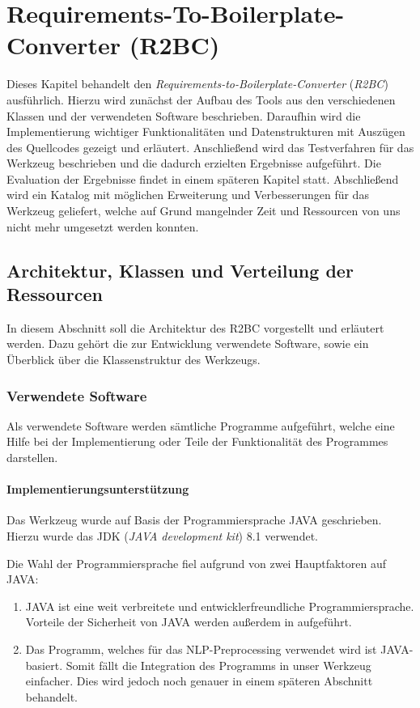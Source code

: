 \documentclass[12pt]{report}
\begin{document}
\chapter{Requirements-To-Boilerplate-Converter (R2BC)}
Dieses Kapitel behandelt den \textit{Requirements-to-Boilerplate-Converter} (\textit{R2BC}) ausführlich. Hierzu wird zunächst der Aufbau des Tools aus den verschiedenen Klassen und der verwendeten Software beschrieben. Daraufhin wird die Implementierung wichtiger Funktionalitäten und Datenstrukturen mit Auszügen des Quellcodes gezeigt und erläutert. Anschließend wird das Testverfahren für das Werkzeug beschrieben und die dadurch erzielten Ergebnisse aufgeführt. Die Evaluation der Ergebnisse findet in einem späteren Kapitel statt. Abschließend wird ein Katalog mit möglichen Erweiterung und Verbesserungen für das Werkzeug geliefert, welche auf Grund mangelnder Zeit und Ressourcen von uns nicht mehr umgesetzt werden konnten. 

\section{Architektur, Klassen und Verteilung der Ressourcen}
In diesem Abschnitt soll die Architektur des R2BC vorgestellt und erläutert werden. Dazu gehört die zur Entwicklung verwendete Software, sowie ein Überblick über die Klassenstruktur des Werkzeugs. 

\subsection{Verwendete Software}
Als verwendete Software werden sämtliche Programme aufgeführt, welche eine Hilfe bei der Implementierung oder Teile der Funktionalität des Programmes darstellen. 

\subsubsection{Implementierungsunterstützung}
Das Werkzeug wurde auf Basis der Programmiersprache JAVA geschrieben. Hierzu wurde das JDK (\textit{JAVA development kit}) 8.1 verwendet. 

Die Wahl der Programmiersprache fiel aufgrund von zwei Hauptfaktoren auf JAVA: 
\begin{enumerate}
\item JAVA ist eine weit verbreitete und entwicklerfreundliche Programmiersprache. Vorteile der Sicherheit von JAVA werden außerdem in \cite{rs18} aufgeführt.
\item Das Programm, welches für das NLP-Preprocessing verwendet wird ist JAVA-basiert. Somit fällt die Integration des Programms in unser Werkzeug einfacher. Dies wird jedoch noch genauer in einem späteren Abschnitt behandelt.
\end{enumerate}
\end{document}
